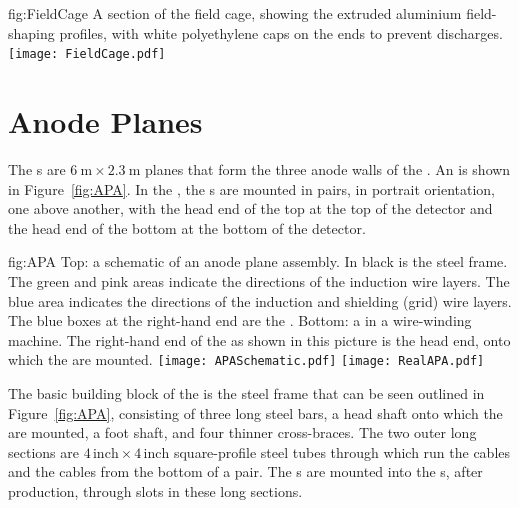 \begin{dunefigure}{fig:FieldCage}
{A section of the field cage, showing the extruded aluminium field-shaping profiles, with white polyethylene caps on the ends to prevent discharges.}
\texttt{[image: FieldCage.pdf]}
\end{dunefigure}

\section{Anode Planes}
\label{sec:fdsp-exec-apas}

The s are $\SI{6}{\meter}\times\SI{2.3}{\meter}$ planes that form the three anode walls of the . An  is shown in Figure~\ref{fig:APA}. In the , the s are mounted in pairs, in portrait orientation, one above another, with the head end of the top  at the top of the detector and the head end of the bottom  at the bottom of the detector.

\begin{dunefigure}{fig:APA}
{Top: a schematic of an anode plane assembly. In black is the steel  frame. The green and pink areas indicate the directions of the induction wire layers. The blue area indicates the directions of the induction and shielding (grid) wire layers. The blue boxes at the right-hand end  are the . Bottom: a   in a wire-winding machine. The right-hand end of the  as shown in this picture is the head end, onto which the  are mounted.}
\texttt{[image: APASchematic.pdf]}
\texttt{[image: RealAPA.pdf]}
\end{dunefigure}

The basic building block of the  is the steel frame that can be seen outlined in Figure~\ref{fig:APA}, consisting of three long steel bars, a head shaft onto which the  are mounted, a foot shaft, and four thinner cross-braces. The two outer long sections are $4\,\mathrm{inch}\times 4\,\mathrm{inch}$ square-profile steel tubes through which run the  cables and the  cables from the bottom  of a pair. The s are mounted into the s, after production, through slots in these long sections.

